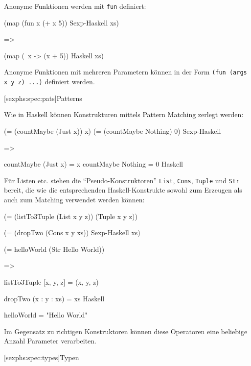 \documentclass[11pt, a4paper, bibgerm]{scrbook}
\newenvironment{DIFnomarkup}{}{}
\newcommand\icode[1]{\lstinline?#1?}
\newcommand\lsubsection{}
\begin{document}
Anonyme Funktionen werden mit \icode{fun} definiert:
\begin{DIFnomarkup}\begin{code}
(map 
  (fun x (+ x 5))           Sexp-Haskell
  xs)

=>

(map
  (\ x -> (x + 5))          Haskell
  xs)
\end{code}\end{DIFnomarkup}
Anonyme Funktionen mit mehreren Parametern können in der Form
\icode{(fun (args x y z) ...)} definiert werden.

\lsubsection[sexphs:spec:pats]{Patterns}

Wie in Haskell können Konstrukturen mittels Pattern Matching zerlegt
werden:
\begin{DIFnomarkup}\begin{code}
(= (countMaybe (Just x)) x)
(= (countMaybe Nothing)  0)      Sexp-Haskell

=>

countMaybe (Just x) = x
countMaybe Nothing  = 0          Haskell
\end{code}\end{DIFnomarkup}
Für Listen etc. stehen die ``Pseudo-Konstruktoren'' \icode{List},
\icode{Cons}, \icode{Tuple} und \icode{Str} bereit, die wie die
entsprechenden Haskell-Konstrukte sowohl zum Erzeugen als auch zum
Matching verwendet werden können:
\begin{DIFnomarkup}\begin{code}
(= (listTo3Tuple (List x y z)) 
   (Tuple x y z))

(= (dropTwo (Cons x y xs))             Sexp-Haskell
  xs)

(= helloWorld (Str Hello World))

=>

listTo3Tuple [x, y, z] = (x, y, z)

dropTwo (x : y : xs) = xs              Haskell

helloWorld = "Hello World"
\end{code}\end{DIFnomarkup}
Im Gegensatz zu richtigen Konstruktoren können diese Operatoren eine
beliebige Anzahl Parameter verarbeiten.

\lsubsection[sexphs:spec:types]{Typen}
\end{document}
